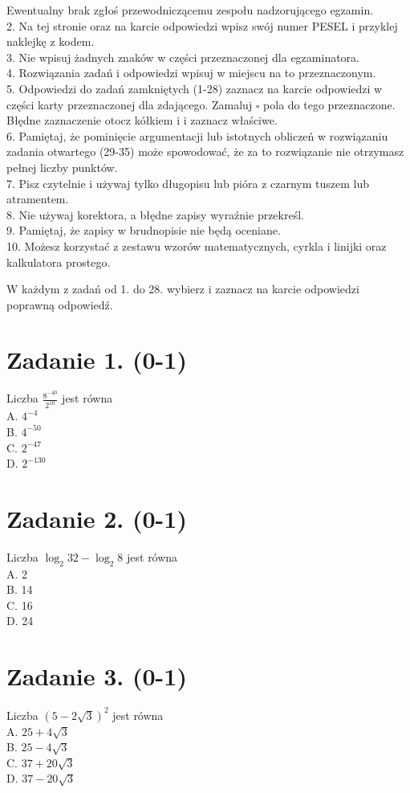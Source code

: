 \documentclass[10pt]{article}
\begin{document}
Ewentualny brak zgłoś przewodniczącemu zespołu nadzorującego egzamin.\\
2. Na tej stronie oraz na karcie odpowiedzi wpisz swój numer PESEL i przyklej naklejkę z kodem.\\
3. Nie wpisuj żadnych znaków w części przeznaczonej dla egzaminatora.\\
4. Rozwiązania zadań i odpowiedzi wpisuj w miejscu na to przeznaczonym.\\
5. Odpowiedzi do zadań zamkniętych (1-28) zaznacz na karcie odpowiedzi w części karty przeznaczonej dla zdającego. Zamaluj \(\square\) pola do tego przeznaczone. Błędne zaznaczenie otocz kółkiem i i zaznacz właściwe.\\
6. Pamiętaj, że pominięcie argumentacji lub istotnych obliczeń w rozwiązaniu zadania otwartego (29-35) może spowodować, że za to rozwiązanie nie otrzymasz pełnej liczby punktów.\\
7. Pisz czytelnie i używaj tylko długopisu lub pióra z czarnym tuszem lub atramentem.\\
8. Nie używaj korektora, a błędne zapisy wyraźnie przekreśl.\\
9. Pamiętaj, że zapisy w brudnopisie nie będą oceniane.\\
10. Możesz korzystać z zestawu wzorów matematycznych, cyrkla i linijki oraz kalkulatora prostego.

W każdym z zadań od 1. do 28. wybierz i zaznacz na karcie odpowiedzi poprawną odpowiedź.

\section*{Zadanie 1. (0-1)}
Liczba \(\frac{8^{-40}}{2^{10}}\) jest równa\\
A. \(4^{-4}\)\\
B. \(4^{-50}\)\\
C. \(2^{-47}\)\\
D. \(2^{-130}\)

\section*{Zadanie 2. (0-1)}
Liczba \(\log _{2} 32-\log _{2} 8\) jest równa\\
A. 2\\
B. 14\\
C. 16\\
D. 24

\section*{Zadanie 3. (0-1)}
Liczba \((5-2 \sqrt{3})^{2}\) jest równa\\
A. \(25+4 \sqrt{3}\)\\
B. \(25-4 \sqrt{3}\)\\
C. \(37+20 \sqrt{3}\)\\
D. \(37-20 \sqrt{3}\)
\end{document}
